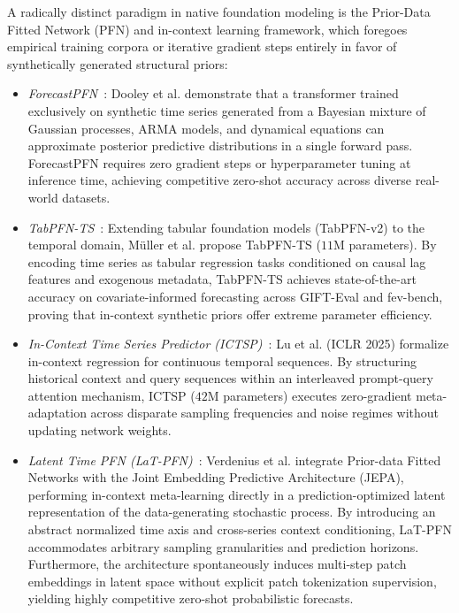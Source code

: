 A radically distinct paradigm in native foundation modeling is the Prior-Data Fitted Network (PFN) and in-context learning framework, which foregoes empirical training corpora or iterative gradient steps entirely in favor of synthetically generated structural priors:
\begin{itemize}[leftmargin=*]
    \item \emph{ForecastPFN}~\cite{dooley2023forecastpfn}: Dooley et al. demonstrate that a transformer trained exclusively on synthetic time series generated from a Bayesian mixture of Gaussian processes, ARMA models, and dynamical equations can approximate posterior predictive distributions in a single forward pass. ForecastPFN requires zero gradient steps or hyperparameter tuning at inference time, achieving competitive zero-shot accuracy across diverse real-world datasets.
    \item \emph{TabPFN-TS}~\cite{muller2025tabpfnts}: Extending tabular foundation models (TabPFN-v2) to the temporal domain, Müller et al. propose TabPFN-TS ($11\text{M}$ parameters). By encoding time series as tabular regression tasks conditioned on causal lag features and exogenous metadata, TabPFN-TS achieves state-of-the-art accuracy on covariate-informed forecasting across GIFT-Eval and fev-bench, proving that in-context synthetic priors offer extreme parameter efficiency.
    \item \emph{In-Context Time Series Predictor (ICTSP)}~\cite{lu2024incontext}: Lu et al. (ICLR 2025) formalize in-context regression for continuous temporal sequences. By structuring historical context and query sequences within an interleaved prompt-query attention mechanism, ICTSP ($42\text{M}$ parameters) executes zero-gradient meta-adaptation across disparate sampling frequencies and noise regimes without updating network weights.
    \item \emph{Latent Time PFN (LaT-PFN)}~\cite{verdenius2024latpfn}: Verdenius et al. integrate Prior-data Fitted Networks with the Joint Embedding Predictive Architecture (JEPA), performing in-context meta-learning directly in a prediction-optimized latent representation of the data-generating stochastic process. By introducing an abstract normalized time axis and cross-series context conditioning, LaT-PFN accommodates arbitrary sampling granularities and prediction horizons. Furthermore, the architecture spontaneously induces multi-step patch embeddings in latent space without explicit patch tokenization supervision, yielding highly competitive zero-shot probabilistic forecasts.
\end{itemize}

